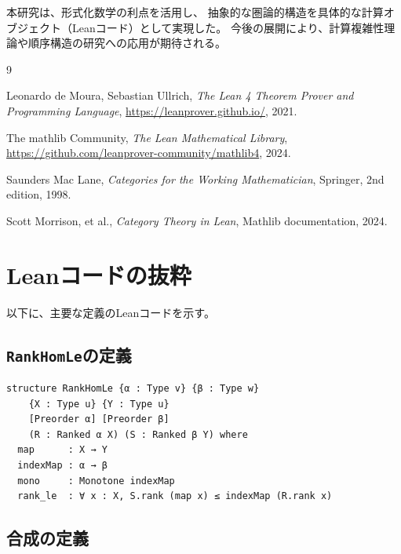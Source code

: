 \documentclass[11pt,a4paper,ja=standard]{bxjsarticle}
\theoremstyle{definition}
\begin{document}
本研究は、形式化数学の利点を活用し、
抽象的な圏論的構造を具体的な計算オブジェクト（Leanコード）として実現した。
今後の展開により、計算複雑性理論や順序構造の研究への応用が期待される。


\begin{thebibliography}{9}

Leonardo de Moura, Sebastian Ullrich,
\textit{The Lean 4 Theorem Prover and Programming Language},
\url{https://leanprover.github.io/}, 2021.

The mathlib Community,
\textit{The Lean Mathematical Library},
\url{https://github.com/leanprover-community/mathlib4}, 2024.

Saunders Mac Lane,
\textit{Categories for the Working Mathematician},
Springer, 2nd edition, 1998.

Scott Morrison, et al.,
\textit{Category Theory in Lean},
Mathlib documentation, 2024.

\end{thebibliography}


\appendix

\section{Leanコードの抜粋}

以下に、主要な定義のLeanコードを示す。

\subsection{\texttt{RankHomLe}の定義}

\begin{verbatim}
structure RankHomLe {α : Type v} {β : Type w}
    {X : Type u} {Y : Type u}
    [Preorder α] [Preorder β]
    (R : Ranked α X) (S : Ranked β Y) where
  map      : X → Y
  indexMap : α → β
  mono     : Monotone indexMap
  rank_le  : ∀ x : X, S.rank (map x) ≤ indexMap (R.rank x)
\end{verbatim}

\subsection{合成の定義}
\end{document}

